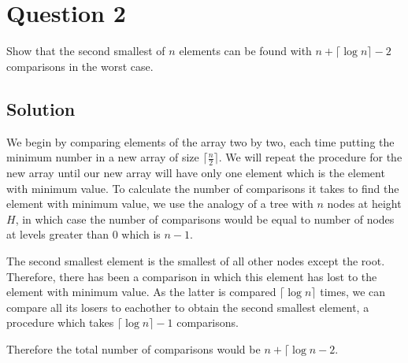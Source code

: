 
\section*{Question 2}
Show that the second smallest of $n$ elements can be found with $n + \lceil \log n \rceil - 2$ comparisons in the worst case.
\subsection*{Solution}
We begin by comparing elements of the array two by two, each time putting the minimum number in a new array of size $\lceil \frac{n}{2} \rceil$. We will repeat the procedure for the new array until our new array will have only one element which is the element with minimum value. To calculate the number of comparisons it takes to find the element with minimum value, we use the analogy of a tree with $n$ nodes at height $H$, in which case the number of comparisons would be equal to number of nodes at levels greater than $0$ which is $n - 1$.

The second smallest element is the smallest of all other nodes except the root. Therefore, there has been a comparison in which this element has lost to the element with minimum value. As the latter is compared $\lceil \log n \rceil$ times, we can compare all its losers to eachother to obtain the second smallest element, a procedure which takes $\lceil \log n \rceil - 1$ comparisons.

Therefore the total number of comparisons would be $n + \lceil \log n - 2$.
